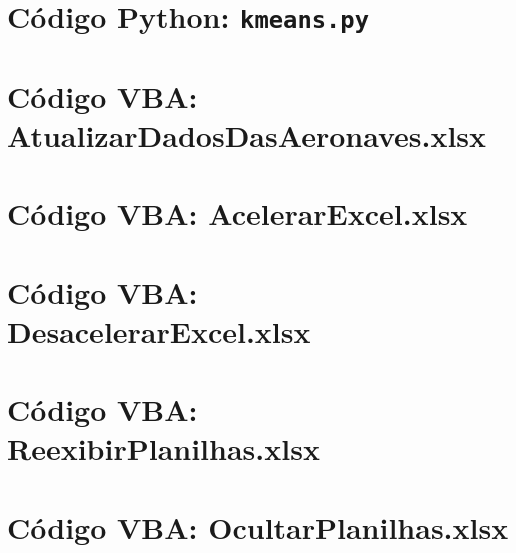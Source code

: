 \documentclass[12pt]{article} %
\begin{document}
	
	\newpage
	\appendix
	
	\def\mycmd{1} %
	
	\ifx\mycmd\undefined
	
	\newpage
	\section{Código Python: \texttt{kmeans.py}}\label{apx:kmeans}
	
	
	
	\newpage
	\section{Código VBA: AtualizarDadosDasAeronaves.xlsx}\label{apx:A}
	
	
	
	\newpage
	\section{Código VBA: AcelerarExcel.xlsx}\label{apx:B}
	
	
	
	\section{Código VBA: DesacelerarExcel.xlsx}\label{apx:C}
	
	
	
	\section{Código VBA: ReexibirPlanilhas.xlsx}\label{apx:D}
	
	
	
	\section{Código VBA: OcultarPlanilhas.xlsx}\label{apx:E}
	
\end{document}
